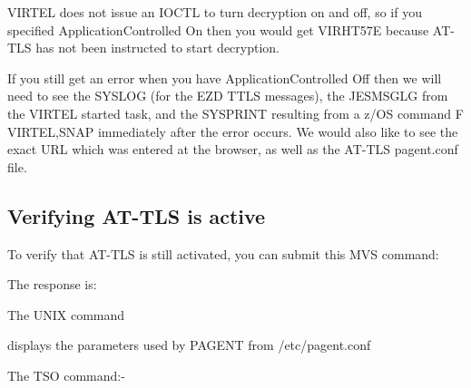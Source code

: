 \documentclass[letterpaper,10pt,english]{sphinxmanual}
\begin{document}
VIRTEL does not issue an IOCTL to turn decryption on and off, so if you specified ApplicationControlled On then you would get VIRHT57E because AT-TLS has not been instructed to start decryption.

If you still get an error when you have ApplicationControlled Off then we will need to see the SYSLOG (for the EZD TTLS messages), the JESMSGLG from the VIRTEL started task, and the SYSPRINT resulting from a z/OS command F VIRTEL,SNAP immediately after the error occurs. We would also like to see the exact URL which was entered at the browser, as well as the AT-TLS pagent.conf file.


\subsection{Verifying AT-TLS is active}
\label{\detokenize{connectivity_guide:verifying-at-tls-is-active}}
To verify that AT-TLS is still activated, you can submit this MVS command:

\begin{sphinxVerbatim}[commandchars=\\\{\}]
 
\end{sphinxVerbatim}

The response is:

\begin{sphinxVerbatim}[commandchars=\\\{\}]
                     
\end{sphinxVerbatim}

The UNIX command

\begin{sphinxVerbatim}[commandchars=\\\{\}]
\end{sphinxVerbatim}

displays the parameters used by PAGENT from /etc/pagent.conf

The TSO command:-

\begin{sphinxVerbatim}[commandchars=\\\{\}]
 
\end{sphinxVerbatim}
\end{document}
